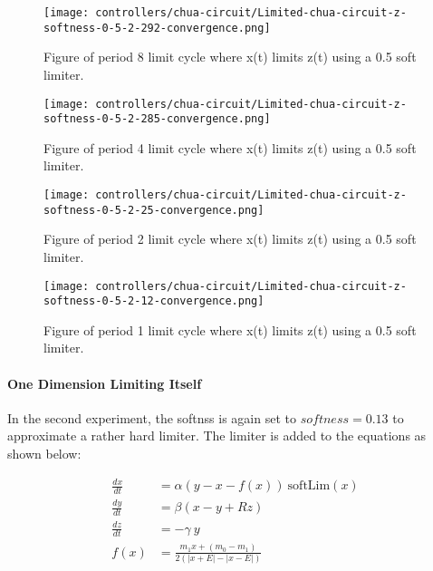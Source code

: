 \documentclass[main]{subfiles}
\begin{document}

\begin{figure}[H]
\centering
\texttt{[image: controllers/chua-circuit/Limited-chua-circuit-z-softness-0-5-2-292-convergence.png]}
\caption[Figure of period 8 limit cycle using a 0.5 soft limiter.]{Figure of period 8 limit cycle where x(t) limits z(t) using a 0.5 soft limiter.}
\label{figure:z-0.5-8-limit-cycle-trajectory}
\end{figure}

\begin{figure}[H]
\centering
\texttt{[image: controllers/chua-circuit/Limited-chua-circuit-z-softness-0-5-2-285-convergence.png]}
\caption[Figure of period 4 limit cycle using a 0.5 soft limiter.]{Figure of period 4 limit cycle where x(t) limits z(t) using a 0.5 soft limiter.}
\label{figure:z-0.5-4-limit-cycle-trajectory}
\end{figure}

\begin{figure}[H]
\centering
\texttt{[image: controllers/chua-circuit/Limited-chua-circuit-z-softness-0-5-2-25-convergence.png]}
\caption[Figure of period 2 limit cycle using a 0.5 soft limiter.]{Figure of period 2 limit cycle where x(t) limits z(t) using a 0.5 soft limiter.}
\label{figure:z-0.5-2-limit-cycle-trajectory}
\end{figure}

\begin{figure}[H]
\centering
\texttt{[image: controllers/chua-circuit/Limited-chua-circuit-z-softness-0-5-2-12-convergence.png]}
\caption[Figure of period 1 limit cycle using a 0.5 soft limiter.]{Figure of period 1 limit cycle where x(t) limits z(t) using a 0.5 soft limiter.}
\label{figure:z-0.5-1-limit-cycle-trajectory}
\end{figure}

\paragraph{One Dimension Limiting Itself} In the second experiment, the softnss is again set to \(softness=0.13\) to approximate a rather hard limiter. The limiter is added to the equations as shown below:

\begin{align*}
\frac{dx}{dt}&=\alpha (y-x-f(x)) ~ \text{softLim}(x)\\
\frac{dy}{dt}&=\beta (x-y + Rz)\\
\frac{dz}{dt}&=-\gamma ~ y\\
f (x) &= \frac{m_1 x + (m_0 - m_1)}{2 (| x + E | -| x - E |)}
\end{align*}
\end{document}
